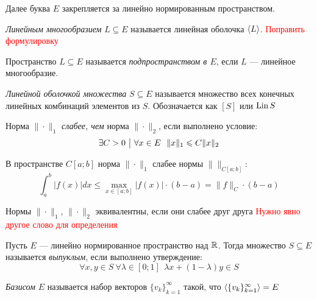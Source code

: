 \begin{note}
	Далее буква $E$ закрепляется за линейно нормированным пространством. 
\end{note}

\begin{definition}
	\textit{Линейным многообразием} $L \subseteq E$ называется линейная оболочка $\left\langle L\right\rangle$. \textcolor{red}{Поправить формулировку}
\end{definition}

\begin{definition}
	Пространство $L \subseteq E$ называется \textit{подпространством в $E$}, если $L$ --- линейное многообразие.
\end{definition}

\begin{definition}
	\textit{Линейной оболочкой множества} $S \subseteq E$ называется множество всех конечных линейных комбинаций элементов из $S$. Обозначается как $[S]$ или $\operatorname{Lin} S$
\end{definition}

\begin{definition}
	Норма $\|\cdot\|_1$ \textit{слабее, чем} норма $\|\cdot\|_2$, если выполнено условие:
	\[
		\exists C > 0 \ \big|\  \forall x \in E\ \ \|x\|_1 \leqslant C\|x\|_2
	\]
\end{definition}

\begin{example}
	В пространстве $C[a; b]$ норма $\|\cdot\|_1$ слабее нормы $\|\|_{C[a; b]}$:
	\[
		\int_a^b |f(x)|dx \le \max_{x \in [a; b]} |f(x)| \cdot (b - a) = \|f\|_C \cdot (b - a)
	\]
\end{example}

\begin{definition}
	Нормы $\|\cdot\|_1$, $\|\cdot\|_2$ эквивалентны, если они слабее друг друга \textcolor{red}{Нужно явно другое слово для определения}
\end{definition}

\begin{definition}
	Пусть $E$ --- линейно нормированное пространство над $\mathbb{R}$. Тогда множество $S \subseteq E$ называется \textit{выпуклым}, если выполнено утверждение:
	\[
		\forall x, y \in S\ \forall \lambda \in [0; 1]\ \ \lambda x + (1 - \lambda)y \in S
	\]
\end{definition}

\begin{definition}
	\textit{Базисом} $E$ называется набор векторов $\{v_k\}_{k = 1}^\infty$ такой, что $\left\langle\{v_k\}_{k = 1}^\infty\right\rangle = E$
\end{definition}

